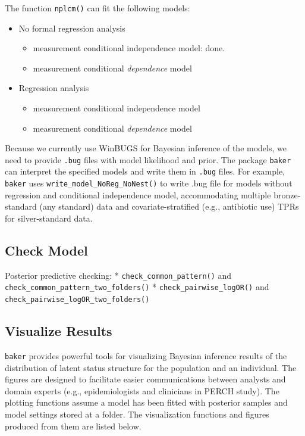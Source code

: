 \documentclass[article]{jss}
\begin{document}
The function \texttt{nplcm()} can fit the following models:

\begin{itemize}
\itemsep1pt\parskip0pt
\item
  No formal regression analysis

  \begin{itemize}
  \itemsep1pt\parskip0pt
  \item
    measurement conditional independence model: done.
  \item
    measurement conditional \emph{dependence} model
  \end{itemize}
\item
  Regression analysis

  \begin{itemize}
  \itemsep1pt\parskip0pt
  \item
    measurement conditional independence model
  \item
    measurement conditional \emph{dependence} model
  \end{itemize}
\end{itemize}

Because we currently use WinBUGS for Bayesian inference of the models,
we need to provide \texttt{.bug} files with model likelihood and prior.
The package \texttt{baker} can interpret the specified models and write
them in \texttt{.bug} files. For example, \texttt{baker} uses
\texttt{write\_model\_NoReg\_NoNest()} to write .bug file for models
without regression and conditional independence model, accommodating
multiple bronze-standard (any standard) data and covariate-stratified
(e.g., antibiotic use) TPRs for silver-standard data.

\subsection{Check Model}\label{check-model}

Posterior predictive checking: * \texttt{check\_common\_pattern()} and
\texttt{check\_common\_pattern\_two\_folders()} *
\texttt{check\_pairwise\_logOR()} and
\texttt{check\_pairwise\_logOR\_two\_folders()}

\subsection{Visualize Results}\label{visualize-results}

\texttt{baker} provides powerful tools for visualizing Bayesian
inference results of the distribution of latent status structure for the
population and an individual. The figures are designed to facilitate
easier communications between analysts and domain experts (e.g.,
epidemiologists and clinicians in PERCH study). The plotting functions
assume a model has been fitted with posterior samples and model settings
stored at a folder. The visualization functions and figures produced
from them are listed below.
\end{document}

